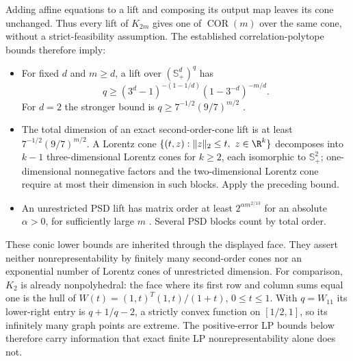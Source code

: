 Adding affine equations to a lift and composing its output map leaves its
cone unchanged. Thus every lift of $K_{2m}$ gives one of
$\operatorname{COR}(m)$ over the same cone, without a strict-feasibility
assumption. The established correlation-polytope bounds therefore imply:
\begin{itemize}
\item For fixed $d$ and $m\ge d$, a lift over $(\mathbb S_+^d)^q$ has
\[
 q\ge(3^d-1)^{-(1-1/d)}(1-3^{-d})^{-m/d}.
\]
For $d=2$ the stronger bound is $q\ge7^{-1/2}(9/7)^{m/2}$
\citep[Theorem 1]{FawziParrilo2013}.
\item The total dimension of an exact second-order-cone lift is at least
$7^{-1/2}(9/7)^{m/2}$. A Lorentz cone
$\{(t,z):\|z\|_2\le t,\ z\in\R^k\}$ decomposes into $k-1$ three-dimensional
Lorentz cones for $k\ge2$, each isomorphic to $\mathbb S_+^2$;
one-dimensional nonnegative factors and the two-dimensional Lorentz cone
require at most their dimension in such blocks. Apply the preceding bound.
\item An unrestricted PSD lift has matrix order at least
$2^{\alpha m^{2/13}}$ for an absolute $\alpha>0$, for sufficiently large
$m$ \citep[Theorem 5.4]{LRS2015}. Several PSD blocks count by total order.
\end{itemize}
These conic lower bounds are inherited through the displayed face. They
assert neither nonrepresentability by finitely many second-order cones nor
an exponential number of Lorentz cones of unrestricted dimension.
For comparison, $K_2$ is already nonpolyhedral: the face where its first
row and column sums equal one is the hull of
$W(t)=(1,t)^T(1,t)/(1+t)$, $0\le t\le1$. With $q=W_{11}$ its lower-right
entry is $q+1/q-2$, a strictly convex function on $[1/2,1]$, so its
infinitely many graph points are extreme. The positive-error LP bounds
below therefore carry information that exact finite LP
nonrepresentability alone does not.

